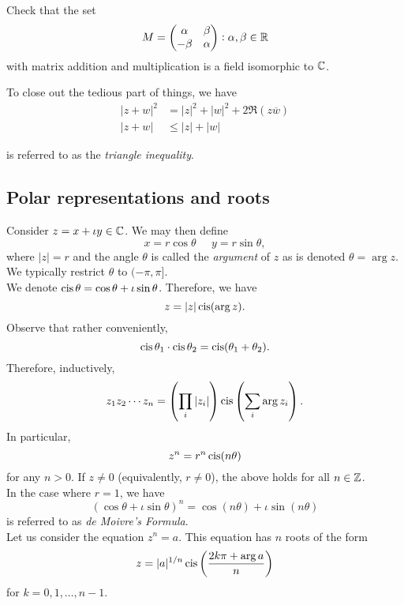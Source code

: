 	\begin{exercise}
		Check that the set
		\[ M = \begin{pmatrix} \alpha & \beta \\ -\beta & \alpha \end{pmatrix} : \alpha,\beta\in\mathbb{R} \]
		with matrix addition and multiplication is a field isomorphic to $\mathbb{C}$.
	\end{exercise}

	To close out the tedious part of things, we have
	\begin{align}
		|z+w|^2 &= |z|^2 + |w|^2 + 2 \Re(z\overline{w}) \nonumber \\
		|z+w| &\le |z| + |w| \label{eqn: triangle inequality}
	\end{align}

	 is referred to as the \emph{triangle inequality}.

\subsection{Polar representations and roots}

	Consider $z = x + \iota y \in \mathbb{C}$. We may then define
	\[ x = r\cos\theta \;\;\;\;\; y = r\sin\theta, \]
	where $|z| = r$ and the angle $\theta$ is called the \emph{argument} of $z$ as is denoted $\theta = \arg z$. We typically restrict $\theta$ to $(-\pi,\pi]$.\\
	We denote $\operatorname{cis}\theta = \cos\theta + \iota\sin\theta$. Therefore, we have
	\[ z = |z| \operatorname{cis}(\arg z). \]
	Observe that rather conveniently,
	\[ \operatorname{cis}\theta_1 \cdot \operatorname{cis}\theta_2 = \operatorname{cis}(\theta_1 + \theta_2). \]
	Therefore, inductively,
	\[ z_1 z_2 \cdots z_n = \left(\prod_{i} |z_i|\right) \operatorname{cis}\left(\sum_i \arg z_i \right). \]
	In particular,
	\[ z^n = r^n \operatorname{cis}(n\theta) \]
	for any $n > 0$. If $z \ne 0$ (equivalently, $r\ne0$), the above holds for all $n \in \mathbb{Z}$.\\
	In the case where $r=1$, we have
	\begin{equation}
		\label{eqn: de moivre's}
		(\cos\theta + \iota\sin\theta)^n = \cos(n\theta) + \iota\sin(n\theta)
	\end{equation}
	 is referred to as \emph{de Moivre's Formula}.\\

	Let us consider the equation $z^n = a$. This equation has $n$ roots of the form
	\[ z = |a|^{1/n} \operatorname{cis}\left( \frac{2k\pi + \arg a}{n} \right) \]
	for $k = 0,1,\ldots,n-1$.

